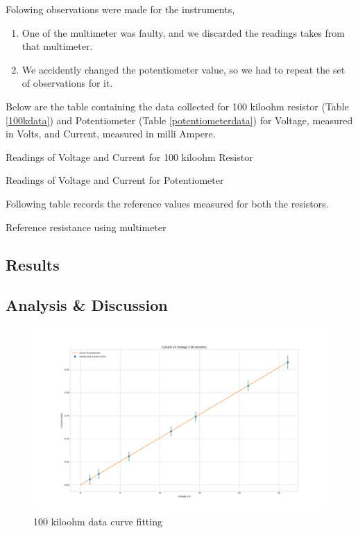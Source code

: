 \documentclass[letterpaper,12pt]{article}
\begin{document}
\noindent
Folowing observations were made for the instruments,

\begin{enumerate}
  \item One of the multimeter was faulty, and we discarded the readings takes from that multimeter.
  \item We accidently changed the potentiometer value, so we had to repeat the set of observations for it.
\end{enumerate}

\noindent
Below are the table containing the data collected for 100 kiloohm resistor (Table \ref{100kdata}) and Potentiometer (Table \ref{potentiometerdata}) for Voltage, measured in Volts, and Current, measured  in milli Ampere.
\begin{table}[H]
  \centering
  \caption{Readings of Voltage and Current for 100 kiloohm Resistor}
  \label{100kdata}
\end{table}

\begin{table}[H]
  \centering
  \caption{Readings of Voltage and Current for Potentiometer}
  \label{potentiometerdata}
\end{table}

\noindent
Following table records the reference values measured for both the resistors.
\begin{table}[H]
  \centering
  \caption{Reference resistance using multimeter}
  \label{referenceres}
\end{table}

\subsection{Results}
\subsection{Analysis \& Discussion }

\begin{figure}[H]
  \centering
  \includegraphics[width=0.95\linewidth]{../lab_1_ex_1_plot_100k.png}    
  \caption{100 kiloohm data curve fitting}
  \label{100k-curve-fit}
\end{figure}
\end{document}
